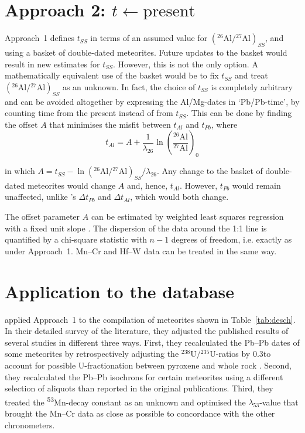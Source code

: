 \documentclass{article}
\begin{document}
\section{Approach 2: $t \leftarrow \mbox{present}$}
\label{sec:regression}

Approach~1 defines $t_{\mathit{SS}}$ in terms of an assumed value for
$({}^{26}\mbox{Al}/{}^{27}\mbox{Al})_{\mathit{SS}}$, and using a basket of
double-dated meteorites.  Future updates to the basket would result in
new estimates for $t_{\mathit{SS}}$. However, this is not the only option. A
mathematically equivalent use of the basket would be to fix $t_{\mathit{SS}}$
and treat $({}^{26}\mbox{Al}/{}^{27}\mbox{Al})_{\mathit{SS}}$ as an unknown. In
fact, the choice of $t_{\mathit{SS}}$ is completely arbitrary and can be
avoided altogether by expressing the Al/Mg-dates in `Pb/Pb-time', by
counting time from the present instead of from $t_{\mathit{SS}}$. This can be
done by finding the offset $A$ that minimises the misfit between
$t_{Al}$ and $t_{Pb}$, where
\begin{equation}
  t_{Al} = A +
  \frac{1}{\lambda_{26}}\ln\left(\frac{{}^{26}\mbox{Al}}{{}^{27}\mbox{Al}}\right)_{0}
  \label{eq:A}
\end{equation}

\noindent in which $A = t_{\mathit{SS}} -
\ln\left({}^{26}\mbox{Al}/{}^{27}\mbox{Al}\right)_{\mathit{SS}}/\lambda_{26}$.
Any change to the basket of double-dated meteorites would change $A$
and, hence, $t_{Al}$. However, $t_{Pb}$ would remain unaffected,
unlike \citet{desch2023a}'s $\Delta{t}_{Pb}$ and $\Delta{t}_{Al}$,
which would both change.\medskip

The offset parameter $A$ can be estimated by weighted least squares
regression with a fixed unit slope \citep{vermeesch2024}. The
dispersion of the data around the 1:1 line is quantified by a
chi-square statistic with $n-1$ degrees of freedom, i.e. exactly as
under Approach~1. Mn--Cr and Hf--W data can be treated in the same
way.

\section{Application to the \citet{desch2023b} database}
\label{sec:application}

\citet{desch2023a,desch2023b} applied Approach~1 to the compilation of
meteorites shown in Table~\ref{tab:desch}. In their detailed survey of
the literature, they adjusted the published results of several studies
in different three ways. First, they recalculated the Pb--Pb dates of
some meteorites by retrospectively adjusting the
${}^{238}\mbox{U}/{}^{235}\mbox{U}$-ratios by 0.3\textperthousand to
account for possible U-fractionation between pyroxene and whole rock
\citep{tissot2017}. Second, they recalculated the Pb--Pb isochrons for
certain meteorites using a different selection of aliquots than
reported in the original publications. Third, they treated the
\textsuperscript{53}Mn-decay constant as an unknown and optimised the
$\lambda_{53}$-value that brought the Mn--Cr data as close as possible
to concordance with the other chronometers. \medskip
\end{document}
